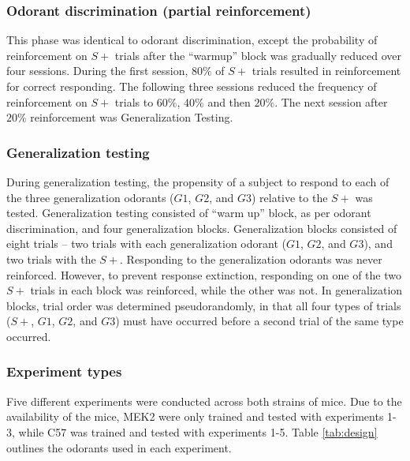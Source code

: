 \subsubsection*{Odorant discrimination (partial reinforcement)}
\label{sec:methods_discrimination}
This phase was identical to odorant discrimination, except the probability of reinforcement on $S+$ trials after the ``warmup'' block was gradually reduced over four sessions. During the first session, $80\%$ of $S+$ trials resulted in reinforcement for correct responding. The following three sessions reduced the frequency of reinforcement on $S+$ trials to $60\%$, $40\%$ and then $20\%$. The next session after $20\%$ reinforcement was Generalization Testing.

\subsubsection*{Generalization testing}
\label{sec:methods_training}
During generalization testing, the propensity of a subject to respond to each of the three generalization odorants ($G1$, $G2$, and $G3$) relative to the $S+$ was tested. Generalization testing consisted of ``warm up'' block, as per odorant discrimination, and four generalization blocks. Generalization blocks consisted of eight trials – two trials with each generalization odorant ($G1$, $G2$, and $G3$), and two trials with the $S+$. Responding to the generalization odorants was never reinforced. However, to prevent response extinction, responding on one of the two $S+$ trials in each block was reinforced, while the other was not. In generalization blocks, trial order was determined pseudorandomly, in that all four types of trials ($S+$, $G1$, $G2$, and $G3$) must have occurred before a second trial of the same type occurred.

\subsubsection*{Experiment types}
\label{sec:methods_experiment_types}
Five different experiments were conducted across both strains of mice. Due to the availability of the mice, MEK2 were only trained and tested with experiments 1-3, while C57 was trained and tested with experiments 1-5.  Table \ref{tab:design} outlines the odorants used in each experiment.

